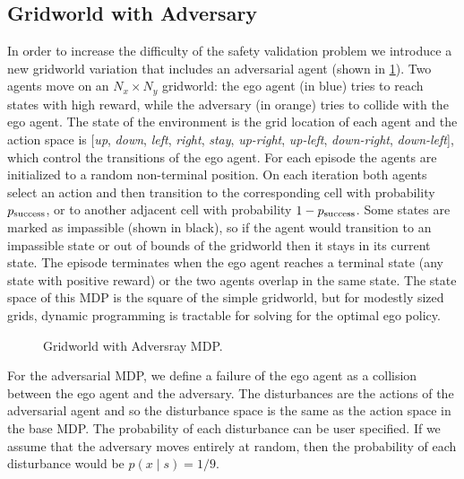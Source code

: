 \subsection{Gridworld with Adversary}
\label{ch3:dw_w_adv}
In order to increase the difficulty of the safety validation problem we introduce a new gridworld variation that includes an adversarial agent (shown in \cref{fig:gridworld_with_adversary}). Two agents move on an $N_x \times N_y$ gridworld: the ego agent (in blue) tries to reach states with high reward, while the adversary (in orange) tries to collide with the ego agent. The state of the environment is the grid location of each agent and the action space is [\emph{up}, \emph{down}, \emph{left}, \emph{right}, \emph{stay}, \emph{up-right}, \emph{up-left}, \emph{down-right}, \emph{down-left}], which control the transitions of the ego agent. For each episode the agents are initialized to a random non-terminal position. On each iteration both agents select an action and then transition to the corresponding cell with probability $p_{\rm success}$, or to another adjacent cell with probability $1-p_{\rm success}$. Some states are marked as impassible (shown in black), so if the agent would transition to an impassible state or out of bounds of the gridworld then it stays in its current state. The episode terminates when the ego agent reaches a terminal state (any state with positive reward) or the two agents overlap in the same state. The state space of this MDP is the square of the simple gridworld, but for modestly sized grids, dynamic programming is tractable for solving for the optimal ego policy. 

\begin{figure}
    \centering
    \small
    
    \caption{Gridworld with Adversray MDP.}
    \label{fig:gridworld_with_adversary}
\end{figure}

For the adversarial MDP, we define a failure of the ego agent as a collision between the ego agent and the adversary. The disturbances are the actions of the adversarial agent and so the disturbance space is the same as the action space in the base MDP. The probability of each disturbance can be user specified. If we assume that the adversary moves entirely at random, then the probability of each disturbance would be $p(x \mid s) = 1 / 9$.

